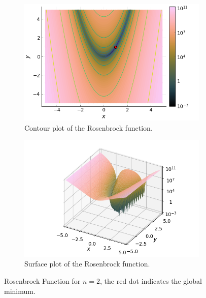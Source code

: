   \begin{figure}[ht!]
    \centering
    \begin{subfigure}[b]{0.45\textwidth}
      \centering
      \includegraphics[width=\textwidth]{img/test_functions/rosenbrock_contour.png}
      \caption{Contour plot of the Rosenbrock function.}
      \label{fig:rosenbrock_contour}
    \end{subfigure}
    \begin{subfigure}[b]{0.45\textwidth}
      \centering
      \includegraphics[width=\textwidth]{img/test_functions/rosenbrock_surface.png}
      \caption{Surface plot of the Rosenbrock function.}
      \label{fig:rosenbrock_surface}
    \end{subfigure}
    \caption{
      Rosenbrock Function for \(n = 2\), the red dot indicates the global
      minimum.
    }
    \label{fig:rosenbrock_function}
  \end{figure}

